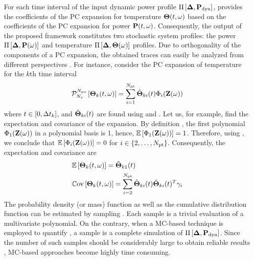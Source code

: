 For each time interval of the input dynamic power profile $\prof{\mP_\dyn}$,  provides the coefficients of the PC expansion for temperature ${\boldsymbol\Theta}(t, \omega)$ based on the coefficients of the PC expansion for power $\mathbf{P}(t, \omega)$. Consequently, the output of the proposed framework constitutes two stochastic system profiles: the power $\prof{\mP(\o)}$ and temperature $\Pi\left[\boldsymbol{\Delta}, {\boldsymbol\Theta}(\omega)\right]$ profiles. Due to orthogonality of the components of a PC expansion, the obtained traces can easily be analyzed from different perspectives \cite{eldred2009, maitre2010}. For instance, consider the PC expansion of temperature for the $k$th time interval
\begin{equation} \elabel{pc-k}
  \oPC{\vars}{\pcorder}{\vTO_k(\t, \o)} = \sum_{i = 1}^{\pcterms} \pcc{\vTO}_{ki}(\t) \pcb_i(\vZ(\o))
\end{equation}
where $t \in [0, \Delta t_k]$, and $\hat{{\boldsymbol\Theta}}_{ki}(t)$ are found using  and . Let us, for example, find the expectation and covariance of the expansion. By definition \cite{xiu2002}, the first polynomial $\Phi_1(\mathbf{Z}(\omega))$ in a polynomial basis is 1, hence, $\mathbb{E}\left[\Phi_1(\mathbf{Z}(\omega))\right] = 1$. Therefore, using , we conclude that $\mathbb{E}\left[\Phi_i(\mathbf{Z}(\omega))\right] = 0$ for $i \in \{ 2, \dotsc, {N_\text{pt}} \}$. Consequently, the expectation and covariance are
\begin{align*}
  & \mathbb{E}\left[{\boldsymbol\Theta}_k(t, \omega)\right] = \hat{{\boldsymbol\Theta}}_{k1}(t) \\
  & \mathbb{C}\text{ov}\left[{\boldsymbol\Theta}_k(t, \omega)\right] = \sum_{i = 2}^{{N_\text{pt}}} \hat{{\boldsymbol\Theta}}_{ki}(t) \hat{{\boldsymbol\Theta}}_{ki}(t)^T \gamma_i
\end{align*}
The probability density (or mass) function as well as the cumulative distribution function can be estimated by sampling . Each sample is a trivial evaluation of a multivariate polynomial. On the contrary, when a MC-based technique is employed to quantify , a sample is a complete simulation of $\prof{\mP_\dyn}$. Since the number of such samples should be considerably large to obtain reliable results \cite{xiu2009}, MC-based approaches become highly time consuming.
